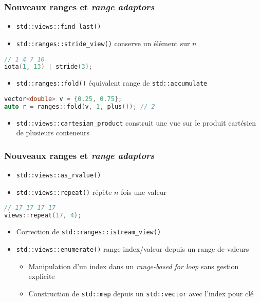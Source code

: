 \documentclass[C++.tex]{subfiles}
\begin{document}
\begin{frame}[fragile]
	\frametitle{Nouveaux ranges et \textit{range adaptors}}
	\begin{itemize}
		\item \lstinline|std::views::find_last()|
		\item \lstinline|std::ranges::stride_view()| conserve un élément sur $n$
	\end{itemize}

	\begin{lstlisting}[language=C++]
// 1 4 7 10
iota(1, 13) | stride(3);\end{lstlisting}

	\begin{itemize}
		\item \lstinline|std::ranges::fold()| équivalent range de \lstinline|std::accumulate|
	\end{itemize}

	\begin{lstlisting}[language=C++]
vector<double> v = {0.25, 0.75};
auto r = ranges::fold(v, 1, plus()); // 2\end{lstlisting}

	\begin{itemize}
		\item \lstinline|std::views::cartesian_product| construit une vue sur le produit cartésien de plusieurs conteneurs
	\end{itemize}
\end{frame}

\begin{frame}[fragile]
	\frametitle{Nouveaux ranges et \textit{range adaptors}}
	\begin{itemize}
		\item \lstinline|std::views::as_rvalue()|
		\item \lstinline|std::views::repeat()| répète $n$ fois une valeur
	\end{itemize}

	\begin{lstlisting}[language=C++]
// 17 17 17 17
views::repeat(17, 4);\end{lstlisting}

	\begin{itemize}
		\item Correction de \lstinline|std::ranges::istream_view()|
		\item \lstinline|std::views::enumerate()| range index/valeur depuis un range de valeurs
		\begin{itemize}
			\item Manipulation d'un index dans un \textit{range-based for loop} sans gestion explicite
			\item Construction de \lstinline|std::map| depuis un \lstinline|std::vector| avec l'index pour clé
		\end{itemize}
	\end{itemize}
\end{frame}
\end{document}
